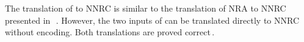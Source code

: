 The translation of \NRAEnv to NNRC is similar to the translation of
NRA to NNRC presented
in~\cite{ShinnarSH15}\,. However,
the two inputs of \NRAEnv can be translated directly to NNRC without encoding.
%
Both translations are proved
correct\,.


